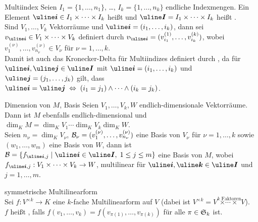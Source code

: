 \begin{Def}{Multiindex}
    Seien $I_1 = \{1, \dotsc, n_1\}$, \dots, $I_k = \{1, \dotsc, n_k\}$
    endliche Indexmengen.
    Ein Element $\mi{i} \in I_1 \times \dotsb \times I_k$ heißt
     und $\mi{I} = I_1 \times \dotsb \times I_k$
    heißt . \\
    Sind $V_1, \dotsc, V_k$ Vektorräume und $\mi{i} = (i_1, \dotsc, i_k)$,
    dann sei $v_\mi{i} \in V_1 \times \dotsb \times V_k$ definiert durch
    $v_\mi{i} = (v_{i_1}^{(1)}, \dotsc, v_{i_k}^{(k)})$, wobei
    $v_1^{(\nu)}, \dotsc, v_{n_\nu}^{(\nu)} \in V_\nu$ für
    $\nu = 1, \dotsc, k$. \\
    Damit ist auch das Kronecker-Delta für Multiindizes definiert
    durch ,
    da für $\mi{i}, \mi{j} \in \mi{I}$ mit $\mi{i} = (i_1, \dotsc, i_k)$ und
    $\mi{j} = (j_1, \dotsc, j_k)$ gilt, dass
    $\mi{i} = \mi{j} \;\Leftrightarrow\; (i_1 = j_1) \land \dotsb \land
    (i_k = j_k)$.
\end{Def}

\begin{Satz}{Dimension von $M$, Basis}
    Seien $V_1, \dotsc, V_k, W$ endlich-dimensionale Vektorräume. \\
    Dann ist $M$ ebenfalls endlich-dimensional und
    $\dim_K M = \dim_K V_1 \dotsm \dim_K V_k \dim_K W$. \\
    Seien $n_\nu = \dim_K V_\nu$,
    $\mathcal{B}_\nu = (v_1^{(\nu)}, \dotsc, v_{n_\nu}^{(\nu)})$ eine Basis
    von $V_\nu$ für $\nu = 1, \dotsc, k$ sowie $(w_1, \dotsc, w_m)$ eine
    Basis von $W$, dann ist
    $\basis{B} = \{f_{\mi{i},j} \;|\; \mi{i} \in \mi{I},\; 1 \le j \le m\}$
    eine Basis von $M$, wobei \\
    $f_{\mi{i},j}: V_1 \times \dotsb \times V_k \rightarrow W$,
     multilinear
    für $\mi{i}, \mi{k} \in \mi{I}$ und $j = 1, \dotsc, m$.
\end{Satz}

\begin{Def}{symmetrische Multilinearform} \\
    Sei $f: V^{\times k} \rightarrow K$ eine $k$-fache Multilinearform auf $V$
    (dabei ist $V^{\times k} =
    V \overset{k \text{ Faktoren}}{\times \dotsb \times} V$). \\
    $f$ heißt , falls
    $f(v_1, \dotsc, v_k) = f(v_{\pi(1)}, \dotsc, v_{\pi(k)})$ für
    alle $\pi \in \mathfrak{S}_k$ ist.
\end{Def}

